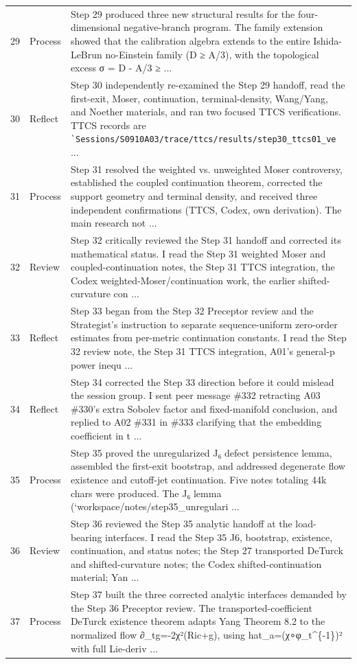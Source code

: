 \documentclass[UTF8,fontset=fandol,zihao=-4]{ctexart}
\begin{document}
\begin{longtable}{r p{} >{\raggedright\arraybackslash}p{}}
29 & Process & Step 29 produced three new structural results for the four-dimensional negative-branch program. The family extension showed that the calibration algebra extends to the entire Ishida-LeBrun no-Einstein family (D ≥ A/3), with the topological excess σ = D - A/3 ≥ ...\\
30 & Reflect & Step 30 independently re-examined the Step 29 handoff, read the first-exit, Moser, continuation, terminal-density, Wang/Yang, and Noether materials, and ran two focused TTCS verifications. TTCS records are \nolinkurl{`Sessions/S0910A03/trace/ttcs/results/step30_ttcs01_ve} ...\\
31 & Process & Step 31 resolved the weighted vs. unweighted Moser controversy, established the coupled continuation theorem, corrected the support geometry and terminal density, and received three independent confirmations (TTCS, Codex, own derivation). The main research not ...\\
32 & Review & Step 32 critically reviewed the Step 31 handoff and corrected its mathematical status. I read the Step 31 weighted Moser and coupled-continuation notes, the Step 31 TTCS integration, the Codex weighted-Moser/continuation work, the earlier shifted-curvature con ...\\
33 & Reflect & Step 33 began from the Step 32 Preceptor review and the Strategist's instruction to separate sequence-uniform zero-order estimates from per-metric continuation constants. I read the Step 32 review note, the Step 31 TTCS integration, A01's general-p power inequ ...\\
34 & Reflect & Step 34 corrected the Step 33 direction before it could mislead the session group. I sent peer message \#332 retracting A03 \#330's extra Sobolev factor and fixed-manifold conclusion, and replied to A02 \#331 in \#333 clarifying that the embedding coefficient in t ...\\
35 & Process & Step 35 proved the unregularized J₆ defect persistence lemma, assembled the first-exit bootstrap, and addressed degenerate flow existence and cutoff-jet continuation. Five notes totaling 44k chars were produced. The J₆ lemma (`workspace/notes/step35\_unregulari ...\\
36 & Review & Step 36 reviewed the Step 35 analytic handoff at the load-bearing interfaces. I read the Step 35 J6, bootstrap, existence, continuation, and status notes; the Step 27 transported DeTurck and shifted-curvature notes; the Codex shifted-continuation material; Yan ...\\
37 & Process & Step 37 built the three corrected analytic interfaces demanded by the Step 36 Preceptor review. The transported-coefficient DeTurck existence theorem adapts Yang Theorem 8.2 to the normalized flow ∂\_tg=-2χ²(Ric+g), using hat\_a=(χ∘φ\_t\textasciicircum{}\{-1\})² with full Lie-deriv ...\\

\end{longtable}
\end{document}
